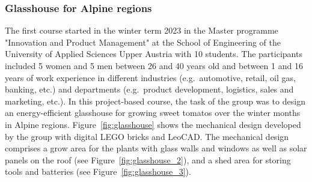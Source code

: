 \documentclass{PDS}
\begin{document}
\subsubsection{Glasshouse for Alpine regions}
\label{sec:master-product-lego}

The first course started in the winter term 2023 in the Master programme "Innovation and Product Management" at the School of Engineering of the University of Applied Sciences Upper Austria with 10 students.
The participants included 5 women and 5 men between 26 and 40 years old and between 1 and 16 years of work experience in different industries (e.g.\ automotive, retail, oil gas, banking, etc.) and departments (e.g.\ product development, logistics, sales and marketing, etc.).
In this project-based course, the task of the group was to design an energy-efficient glasshouse for growing sweet tomatos over the winter months in Alpine regions.
Figure~\ref{fig:glasshouse} shows the mechanical design developed by the group with digital LEGO bricks and LeoCAD.
The mechanical design comprises a grow area for the plants with glass walls and windows as well as solar panels on the roof (see Figure~\ref{fig:glasshouse_2}), and a shed area for storing tools and batteries (see Figure~\ref{fig:glasshouse_3}).
\end{document}
